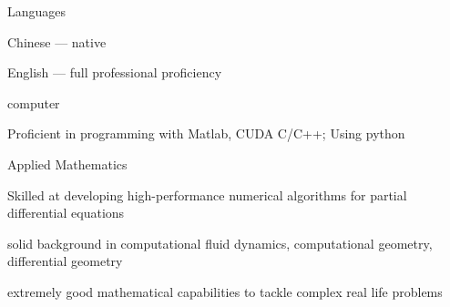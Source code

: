 
\begin{cvskills}
  \cvskill
    {Languages} %
    {
      \begin{cvitems} %
        \item {Chinese --- native}
        \item {English --- full professional proficiency}
      \end{cvitems}
    } %

  \cvskill
    {computer} %
    {
      \begin{cvitems} %
        \item {Proficient in programming with Matlab, CUDA C/C++; Using python}
      \end{cvitems}
    } %

    \cvskill
    {Applied Mathematics} %
    {
      \begin{cvitems} %
        \item {Skilled at developing high-performance numerical algorithms for partial differential equations}
        \item {solid background in computational fluid dynamics, computational geometry, differential geometry}
        \item {extremely good mathematical capabilities to tackle complex real life problems}
      \end{cvitems}
    } %

\end{cvskills}
